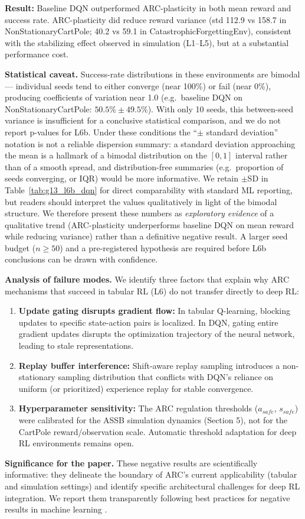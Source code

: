 \documentclass{article}
\begin{document}
\textbf{Result:} Baseline DQN outperformed ARC-plasticity in both mean reward and success rate. ARC-plasticity did reduce reward variance (std 112.9 vs 158.7 in NonStationaryCartPole; 40.2 vs 59.1 in CatastrophicForgettingEnv), consistent with the stabilizing effect observed in simulation (L1--L5), but at a substantial performance cost.

\textbf{Statistical caveat.} Success-rate distributions in these environments are bimodal --- individual seeds tend to either converge (near 100\%) or fail (near 0\%), producing coefficients of variation near 1.0 (e.g.\ baseline DQN on NonStationaryCartPole: $50.5\% \pm 49.5\%$). With only 10 seeds, this between-seed variance is insufficient for a conclusive statistical comparison, and we do not report p-values for L6b. Under these conditions the ``$\pm$ standard deviation'' notation is not a reliable dispersion summary: a standard deviation approaching the mean is a hallmark of a bimodal distribution on the $[0,1]$ interval rather than of a smooth spread, and distribution-free summaries (e.g.\ proportion of seeds converging, or IQR) would be more informative. We retain $\pm$SD in Table~\ref{tab:g13_l6b_dqn} for direct comparability with standard ML reporting, but readers should interpret the values qualitatively in light of the bimodal structure. We therefore present these numbers as \emph{exploratory evidence} of a qualitative trend (ARC-plasticity underperforms baseline DQN on mean reward while reducing variance) rather than a definitive negative result. A larger seed budget ($n \ge 50$) and a pre-registered hypothesis are required before L6b conclusions can be drawn with confidence.

\textbf{Analysis of failure modes.} We identify three factors that explain why ARC mechanisms that succeed in tabular RL (L6) do not transfer directly to deep RL:
\begin{enumerate}
    \item \textbf{Update gating disrupts gradient flow:} In tabular Q-learning, blocking updates to specific state-action pairs is localized. In DQN, gating entire gradient updates disrupts the optimization trajectory of the neural network, leading to stale representations.
    \item \textbf{Replay buffer interference:} Shift-aware replay sampling introduces a non-stationary sampling distribution that conflicts with DQN's reliance on uniform (or prioritized) experience replay for stable convergence.
    \item \textbf{Hyperparameter sensitivity:} The ARC regulation thresholds ($a_{safe}$, $s_{safe}$) were calibrated for the ASSB simulation dynamics (Section 5), not for the CartPole reward/observation scale. Automatic threshold adaptation for deep RL environments remains open.
\end{enumerate}

\textbf{Significance for the paper.} These negative results are scientifically informative: they delineate the boundary of ARC's current applicability (tabular and simulation settings) and identify specific architectural challenges for deep RL integration. We report them transparently following best practices for negative results in machine learning \cite{Garcia2015}.
\end{document}

